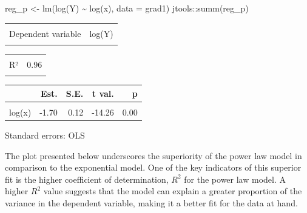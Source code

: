 \documentclass[
  letterpaper,
]{book}
\newenvironment{Shaded}{\begin{snugshade}}{\end{snugshade}}
\newcommand{\AttributeTok}[1]{\textcolor[rgb]{0.40,0.45,0.13}{#1}}
\newcommand{\FunctionTok}[1]{\textcolor[rgb]{0.28,0.35,0.67}{#1}}
\newcommand{\NormalTok}[1]{\textcolor[rgb]{0.00,0.23,0.31}{#1}}
\newcommand{\OtherTok}[1]{\textcolor[rgb]{0.00,0.23,0.31}{#1}}
\newcommand{\SpecialCharTok}[1]{\textcolor[rgb]{0.37,0.37,0.37}{#1}}
\begin{document}
\begin{Shaded}
\begin{Highlighting}[]
\NormalTok{reg\_p }\OtherTok{\textless{}{-}} \FunctionTok{lm}\NormalTok{(}\FunctionTok{log}\NormalTok{(Y) }\SpecialCharTok{\textasciitilde{}} \FunctionTok{log}\NormalTok{(x), }\AttributeTok{data =}\NormalTok{ grad1)}
\NormalTok{jtools}\SpecialCharTok{::}\FunctionTok{summ}\NormalTok{(reg\_p)}
\end{Highlighting}
\end{Shaded}

\begin{table}[!h]
\centering
\begin{tabular}{lr}
\toprule
\cellcolor{gray!6}{Observations} & \cellcolor{gray!6}{10}\\
Dependent variable & log(Y)\\
\cellcolor{gray!6}{Type} & \cellcolor{gray!6}{OLS linear regression}\\
\bottomrule
\end{tabular}
\end{table} \begin{table}[!h]
\centering
\begin{tabular}{lr}
\toprule
\cellcolor{gray!6}{F(1,8)} & \cellcolor{gray!6}{203.26}\\
R² & 0.96\\
\cellcolor{gray!6}{Adj. R²} & \cellcolor{gray!6}{0.96}\\
\bottomrule
\end{tabular}
\end{table} \begin{table}[!h]
\centering
\begin{threeparttable}
\begin{tabular}{lrrrr}
\toprule
  & Est. & S.E. & t val. & p\\
\midrule
\cellcolor{gray!6}{(Intercept)} & \cellcolor{gray!6}{5.56} & \cellcolor{gray!6}{0.25} & \cellcolor{gray!6}{22.66} & \cellcolor{gray!6}{0.00}\\
log(x) & -1.70 & 0.12 & -14.26 & 0.00\\
\bottomrule
\end{tabular}
\begin{tablenotes}
\item Standard errors: OLS
\end{tablenotes}
\end{threeparttable}
\end{table}

The plot presented below underscores the superiority of the power law
model in comparison to the exponential model. One of the key indicators
of this superior fit is the higher coefficient of determination, \(R^2\)
for the power law model. A higher \(R^2\) value suggests that the model
can explain a greater proportion of the variance in the dependent
variable, making it a better fit for the data at hand.
\end{document}
